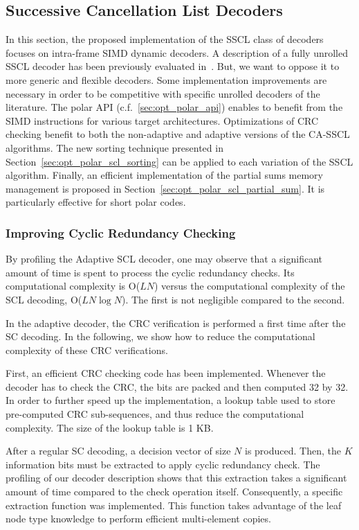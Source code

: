 \subsection{Successive Cancellation List Decoders}
\label{sec:opt_polar_scl}

In this section, the proposed implementation of the SSCL class of decoders
focuses on intra-frame SIMD dynamic decoders. A description of a fully unrolled
SSCL decoder has been previously evaluated in~\cite{Sarkis2016}. But, we want to
oppose it to more generic and flexible decoders. Some implementation
improvements are necessary in order to be competitive with specific unrolled
decoders of the literature. The polar API (c.f.~\ref{sec:opt_polar_api}) enables
to benefit from the SIMD instructions for various target architectures.
Optimizations of CRC checking benefit to both the non-adaptive and adaptive
versions of the CA-SSCL algorithms. The new sorting technique presented in
Section~\ref{sec:opt_polar_scl_sorting} can be applied to each variation of the
SSCL algorithm. Finally, an efficient implementation of the partial sums memory
management is proposed in Section~\ref{sec:opt_polar_scl_partial_sum}. It is
particularly effective for short polar codes.

\subsubsection{Improving Cyclic Redundancy Checking}
\label{sec:opt_polar_scl_crc}

By profiling the Adaptive SCL decoder, one may observe that a significant amount
of time is spent to process the cyclic redundancy checks. Its computational
complexity is O($LN$) versus the computational complexity of the SCL decoding,
O($LN\log N$). The first is not negligible compared to the second.

In the adaptive decoder, the CRC verification is performed a first time after
the SC decoding. In the following, we show how to reduce the computational
complexity of these CRC verifications.

First, an efficient CRC checking code has been implemented. Whenever the decoder
has to check the CRC, the bits are packed and then computed 32 by 32. In order
to further speed up the implementation, a lookup table used to store
pre-computed CRC sub-sequences, and thus reduce the computational complexity.
The size of the lookup table is 1 KB.

After a regular SC decoding, a decision vector of size $N$ is produced. Then,
the $K$ information bits must be extracted to apply cyclic redundancy check. The
profiling of our decoder description shows that this extraction takes a
significant amount of time compared to the check operation itself. Consequently,
a specific extraction function was implemented. This function takes advantage of
the leaf node type knowledge to perform efficient multi-element copies.


